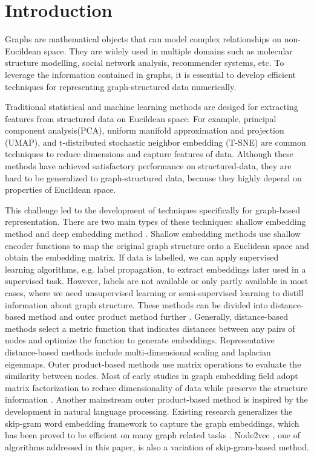 \documentclass[sigconf]{acmart}
\begin{document}
\section{Introduction}
Graphs are mathematical objects that can model complex relationships on non-Eucildean space. They are widely used in multiple domains such as molecular structure modelling, social network analysis, recommender systems, etc. To leverage the information contained in graphs, it is essential to develop efficient techniques for representing graph-structured data numerically.\par
Traditional statistical and machine learning methods are desiged for extracting features from structured data on Eucildean space. For example, principal component analysis(PCA), uniform manifold approximation and projection (UMAP), and t-distributed stochastic neighbor embedding (T-SNE) are common techniques to reduce dimensions and capture features of data. Although these methods have achieved satisfactory performance on structured-data, they are hard to be generalized to graph-structured data, because they highly depend on properties of Eucildean space.\par
This challenge led to the development of techniques specifically for graph-based representation. There are two main types of these techniques: shallow embedding method and deep embedding method \cite{murphy2022}. Shallow embedding methods use shallow encoder functions to map the original graph structure onto a Euclidean space and obtain the embedding matrix. If data is labelled, we can apply supervised learning algorithms, e.g. label propagation, to extract embeddings later used in a supervised task. However, labels are not available or only partly available in most cases, where we need unsupervised learning or semi-supervised learning to distill information about graph structure. These methods can be divided into distance-based method and outer product method further \cite{murphy2022}. Generally, distance-based methods select a metric function that indicates distances between any pairs of nodes and optimize the function to generate embeddings. Representative distance-based methods include multi-dimensional scaling and laplacian eigenmaps. Outer product-based methods use matrix operations to evaluate the similarity between nodes. Most of early studies in graph embedding field adopt matrix factorization to reduce dimensionality of data while preserve the structure information \cite{cai2018}. Another mainstream outer product-based method is inspired by the development in natural language processing. Existing research generalizes the skip-gram word embedding framework to capture the graph embeddings, which has been proved to be efficient on many graph related tasks \cite{deepwalk}\cite{line}. Node2vec \cite{node2vec}, one of algorithms addressed in this paper, is also a variation of skip-gram-based method.\par
\end{document}
